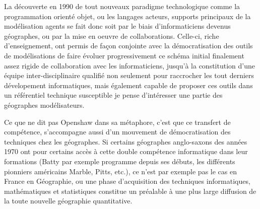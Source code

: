 
La découverte en 1990 de tout nouveaux paradigme technologique comme la programmation orienté objet, ou les langages acteurs, supports principaux de la modélisation agents se fait donc soit par le biais d’informaticiens devenus géographes, ou par la mise en oeuvre de collaborations. Celle-ci, riche d’enseignement, ont permis de façon conjointe avec la démocratisation des outils de modélisations de faire évoluer progressivement ce schéma initial finalement assez rigide de collaboration avec les informaticiens, jusqu’à la constitution d’une équipe inter-disciplinaire qualifié non seulement pour raccrocher les tout derniers dévelopement informatiques, mais également capable de proposer ces outils dans un référentiel technique susceptible je pense d'intéresser une partie des géographes modélisateurs.


Ce que ne dit pas Openshaw dans sa métaphore, c’est que ce transfert de compétence, s’accompagne aussi d’un mouvement de démocratisation des techniques chez les géographes. Si certains géographes anglo-saxons des années 1970 ont pour certains accès à cette double compétence informatique dans leur formations (Batty par exemple programme depuis ses débuts, les différents pionniers américains Marble, Pitts, etc.), ce n’est par exemple pas le cas en France en Géographie, ou une phase d’acquisition des techniques informatiques, mathématiques et statistiques constitue un préalable à une plus large diffusion de la toute nouvelle géographie quantitative. 

